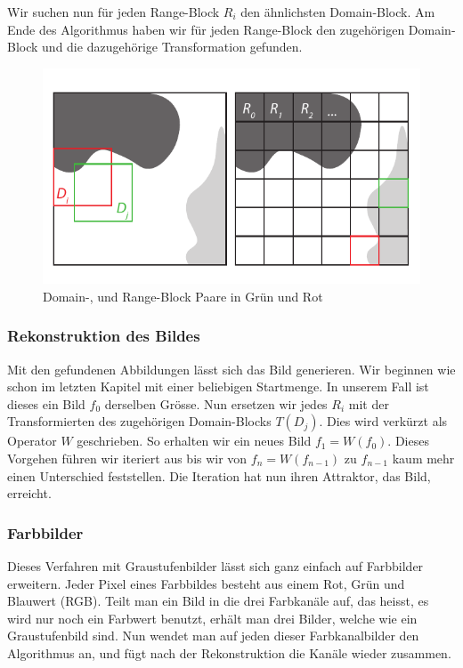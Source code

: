 Wir suchen nun für jeden Range-Block $R_i$ den ähnlichsten Domain-Block.
Am Ende des Algorithmus haben wir für jeden Range-Block den zugehörigen Domain-Block und die dazugehörige Transformation gefunden.

\begin{figure}	
	\centering
	\includegraphics[width=\textwidth]{papers/ifs/images/FIC}
	\caption{Domain-, und Range-Block Paare in Grün und Rot}
	\label{ifs:FIC}
\end{figure}

\subsubsection{Rekonstruktion des Bildes}
Mit den gefundenen Abbildungen lässt sich das Bild generieren.
Wir beginnen wie schon im letzten Kapitel mit einer beliebigen Startmenge.
In unserem Fall ist dieses ein Bild  $f_0$ derselben Grösse.
Nun ersetzen wir jedes $R_i$ mit der Transformierten des zugehörigen Domain-Blocks $T(D_j)$.
Dies wird verkürzt als Operator $W$ geschrieben.
So erhalten wir ein neues Bild $f_1 = W(f_0)$.
Dieses Vorgehen führen wir iteriert aus bis wir von $f_n = W(f_{n-1})$ zu $f_{n-1}$ kaum mehr einen Unterschied feststellen. Die Iteration hat nun ihren Attraktor, das Bild, erreicht.

\subsubsection{Farbbilder}
Dieses Verfahren mit Graustufenbilder lässt sich ganz einfach auf Farbbilder erweitern.
Jeder Pixel eines Farbbildes besteht aus einem Rot, Grün und Blauwert (RGB).
Teilt man ein Bild in die drei Farbkanäle auf, das heisst, es wird nur noch ein Farbwert benutzt, erhält man drei Bilder, welche wie ein Graustufenbild sind.
Nun wendet man auf jeden dieser Farbkanalbilder den Algorithmus an, und fügt nach der Rekonstruktion die Kanäle wieder zusammen. 

